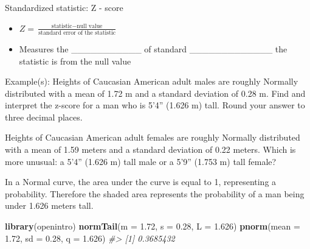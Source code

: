 \documentclass[
]{report}
\newenvironment{Shaded}{\begin{snugshade}}{\end{snugshade}}
\newcommand{\AttributeTok}[1]{\textcolor[rgb]{0.13,0.29,0.53}{#1}}
\newcommand{\CommentTok}[1]{\textcolor[rgb]{0.56,0.35,0.01}{\textit{#1}}}
\newcommand{\FloatTok}[1]{\textcolor[rgb]{0.00,0.00,0.81}{#1}}
\newcommand{\FunctionTok}[1]{\textcolor[rgb]{0.13,0.29,0.53}{\textbf{#1}}}
\newcommand{\NormalTok}[1]{#1}
\providecommand{\tightlist}{%
  \setlength{\itemsep}{0pt}\setlength{\parskip}{0pt}}
\begin{document}
\newpage

Standardized statistic: Z - score

\vspace{1mm}

\begin{itemize}
\tightlist
\item
  \(Z = \frac{\mbox{statistic} - \mbox{null value}}{\mbox{standard error of the statistic}}\)
\end{itemize}

\vspace{0.5in}

\begin{itemize}
\tightlist
\item
  Measures the \_\_\_\_\_\_\_\_\_\_\_ of standard \_\_\_\_\_\_\_\_\_\_\_\_\_ the statistic is from the null value
\end{itemize}

Example(s): Heights of Caucasian American adult males are roughly Normally distributed with a mean of 1.72 m and a standard deviation of 0.28 m. Find and interpret the z-score for a man who is 5'4'' (1.626 m) tall. Round your answer to three decimal places.

\vspace{0.6in}

Heights of Caucasian American adult females are roughly Normally distributed with a mean of 1.59 meters and a standard deviation of 0.22 meters. Which is more unusual: a 5'4'' (1.626 m) tall male or a 5'9'' (1.753 m) tall female?

\vspace{0.6in}

In a Normal curve, the area under the curve is equal to 1, representing a probability. Therefore the shaded area represents the probability of a man being under 1.626 meters tall.

\begin{Shaded}
\begin{Highlighting}[]
\FunctionTok{library}\NormalTok{(openintro)}
\FunctionTok{normTail}\NormalTok{(}\AttributeTok{m =} \FloatTok{1.72}\NormalTok{, }\AttributeTok{s =} \FloatTok{0.28}\NormalTok{, }\AttributeTok{L =} \FloatTok{1.626}\NormalTok{)}
\FunctionTok{pnorm}\NormalTok{(}\AttributeTok{mean =} \FloatTok{1.72}\NormalTok{, }\AttributeTok{sd =} \FloatTok{0.28}\NormalTok{, }\AttributeTok{q =} \FloatTok{1.626}\NormalTok{)}
\CommentTok{\#\textgreater{} [1] 0.3685432}
\end{Highlighting}
\end{Shaded}
\end{document}
